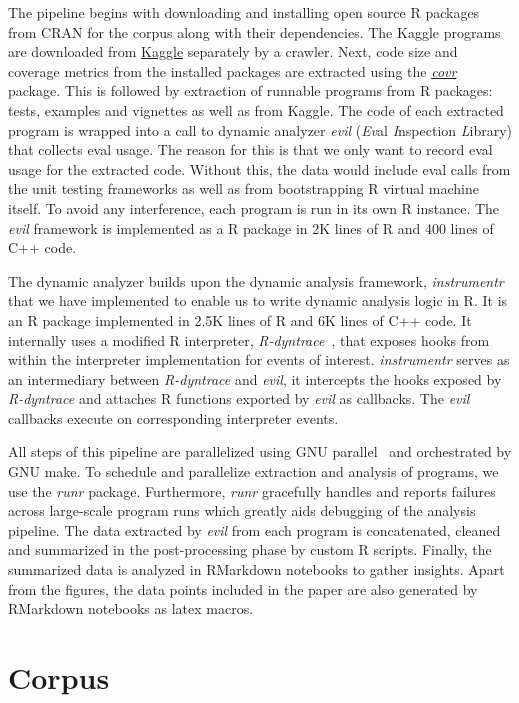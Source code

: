 \documentclass[USenglish,cleveref, autoref, thm-restate]{lipics-v2019}
\newcommand{\evil}{\emph{evil}\xspace}
\newcommand{\instrumentr}{\emph{instrumentr}\xspace}
\newcommand{\rdyntrace}{\emph{R-dyntrace}\xspace}
\newcommand{\covr}{\emph{covr}\xspace}
\newcommand{\runr}{\emph{runr}\xspace}
\begin{document}
The pipeline begins with downloading and installing open source R packages
from CRAN for the corpus along with their dependencies. The Kaggle programs
are downloaded from \href{http://www.kaggle.com}{Kaggle} separately by a
crawler.  Next, code size and coverage metrics from the installed packages
are extracted using the \href{ https://github.com/r-lib/covr}{\covr}
package. This is followed by extraction of runnable programs from R
packages: tests, examples and vignettes as well as from Kaggle. The code of
each extracted program is wrapped into a call to dynamic analyzer
\emph{evil} (\emph{Ev}al \emph{I}nspection \emph{L}ibrary) that collects eval
usage. The reason for this is that we only want to record eval usage for the
extracted code. Without this, the data would include eval calls from the
unit testing frameworks as well as from bootstrapping R virtual machine
itself. To avoid any interference, each program is run in its own R
instance. The \emph{evil} framework is implemented as a R package in 2K lines of
R and 400 lines of C++ code.

The dynamic analyzer builds upon the dynamic analysis framework, \instrumentr
that we have implemented to enable us to write dynamic analysis logic in R. It
is an R package implemented in 2.5K lines of R and 6K lines of C++ code. It
internally uses a modified R interpreter, \rdyntrace~\cite{oopsla19a}, that
exposes hooks from within the interpreter implementation for events of interest.
\instrumentr serves as an intermediary between \rdyntrace and \evil, it
intercepts the hooks exposed by \rdyntrace and attaches R functions exported by
\evil as callbacks. The \evil callbacks execute on corresponding interpreter
events.

All steps of this pipeline are parallelized using GNU
parallel~\cite{GNUparallel} and orchestrated by GNU make. To schedule and
parallelize extraction and analysis of programs, we use the \runr
package. Furthermore, \runr gracefully handles and reports failures across
large-scale program runs which greatly aids debugging of the analysis
pipeline.  The data extracted by \evil from each program is concatenated,
cleaned and summarized in the post-processing phase by custom R
scripts. Finally, the summarized data is analyzed in RMarkdown notebooks to
gather insights. Apart from the figures, the data points included in the
paper are also generated by RMarkdown notebooks as latex macros.

\section{Corpus}
\end{document}
